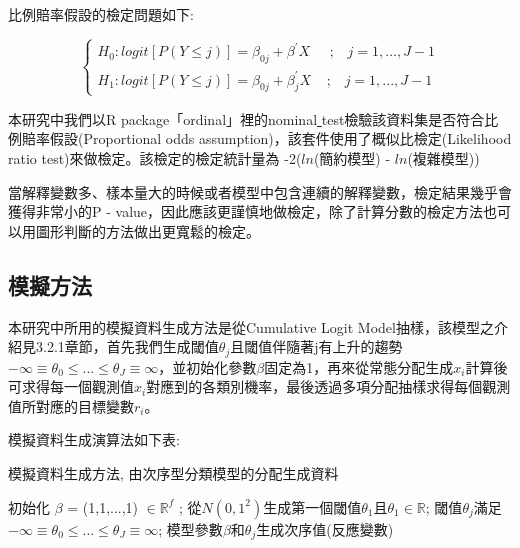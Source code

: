 	
比例賠率假設的檢定問題如下:

\begin{equation} \nonumber \left\{\begin{array}{l} H_0: logit[P(Y \leq j)] = \beta_{0j} + \beta^{'}X \;\;\;\;\;;\;\;\; j = 1, ... , J-1\\   H_1: logit[P(Y \leq j)] = \beta_{0j} + \beta^{'}_jX \;\;\;\;;\;\;\; j = 1, ... , J-1  \end{array}\right.
\end{equation}

	本研究中我們以R package「ordinal」裡的nominal\underline{ }test檢驗該資料集是否符合比例賠率假設(Proportional odds assumption)，該套件使用了概似比檢定(Likelihood ratio test)來做檢定。該檢定的檢定統計量為 -2($ln$(簡約模型) - $ln$(複雜模型))
	
	當解釋變數多、樣本量大的時候或者模型中包含連續的解釋變數，檢定結果幾乎會獲得非常小的P - value，因此應該更謹慎地做檢定，除了計算分數的檢定方法也可以用圖形判斷的方法做出更寬鬆的檢定。
	

	


	

\subsection{模擬方法}

  	本研究中所用的模擬資料生成方法是從Cumulative Logit Model抽樣，該模型之介紹見3.2.1章節，首先我們生成閾值$\theta_j$且閾值伴隨著j有上升的趨勢$\nonumber - \infty \equiv \theta_0 \leq  ... \leq  \theta_J \equiv \infty$，並初始化參數$\beta$固定為1，再來從常態分配生成$x_i$計算後可求得每一個觀測值$x_i$對應到的各類別機率，最後透過多項分配抽樣求得每個觀測值所對應的目標變數$r_i$。
  	

	模擬資料生成演算法如下表: 	 
\begin{algorithm}[H]   
	\caption{模擬資料生成方法, 由次序型分類模型的分配生成資料}   
	\label{alg.1}   
	\begin{algorithmic}[1]   	   	
		\State 初始化 $\beta$ = (1,1,...,1) $\in \mathbb{R}^f$ ;   	
		\State 從$N(0,1^2)$生成第一個閾值$\theta_1$且$\theta_1 \in \mathbb{R}$;   
		\State 閾值$\theta_j$滿足$\nonumber - \infty \equiv \theta_0 \leq  ... \leq  \theta_J \equiv \infty$;   		
		\Ensure   	 
		  模型參數$\beta$和${\theta_j}$生成次序值(反應變數)     
 
         

	\end{algorithmic} 

\end{algorithm}


